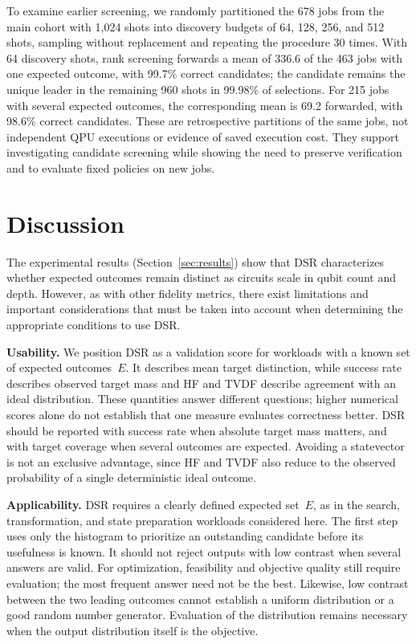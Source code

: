 \documentclass[pdflatex,sn-mathphys-num]{sn-jnl}
\theoremstyle{thmstyleone}%
\theoremstyle{thmstyletwo}%
\theoremstyle{thmstylethree}%
\begin{document}
To examine earlier screening, we randomly partitioned the 678 jobs from the main cohort with 1{,}024 shots into discovery budgets of 64, 128, 256, and 512 shots, sampling without replacement and repeating the procedure 30 times. With 64 discovery shots, rank screening forwards a mean of 336.6 of the 463 jobs with one expected outcome, with 99.7\% correct candidates; the candidate remains the unique leader in the remaining 960 shots in 99.98\% of selections. For 215 jobs with several expected outcomes, the corresponding mean is 69.2 forwarded, with 98.6\% correct candidates. These are retrospective partitions of the same jobs, not independent QPU executions or evidence of saved execution cost. They support investigating candidate screening while showing the need to preserve verification and to evaluate fixed policies on new jobs.

\FloatBarrier
\section{Discussion}\label{sec:discussion}

The experimental results (Section~\ref{sec:results}) show that DSR characterizes whether expected outcomes remain distinct as circuits scale in qubit count and depth. However, as with other fidelity metrics, there exist limitations and important considerations that must be taken into account when determining the appropriate conditions to use DSR.

\textbf{Usability.} We position DSR as a validation score for workloads with a known set of expected outcomes~$E$. It describes mean target distinction, while success rate describes observed target mass and HF and TVDF describe agreement with an ideal distribution. These quantities answer different questions; higher numerical scores alone do not establish that one measure evaluates correctness better. DSR should be reported with success rate when absolute target mass matters, and with target coverage when several outcomes are expected. Avoiding a statevector is not an exclusive advantage, since HF and TVDF also reduce to the observed probability of a single deterministic ideal outcome.

\textbf{Applicability.} DSR requires a clearly defined expected set~$E$, as in the search, transformation, and state preparation workloads considered here. The first step uses only the histogram to prioritize an outstanding candidate before its usefulness is known. It should not reject outputs with low contrast when several answers are valid. For optimization, feasibility and objective quality still require evaluation; the most frequent answer need not be the best. Likewise, low contrast between the two leading outcomes cannot establish a uniform distribution or a good random number generator. Evaluation of the distribution remains necessary when the output distribution itself is the objective.
\end{document}
